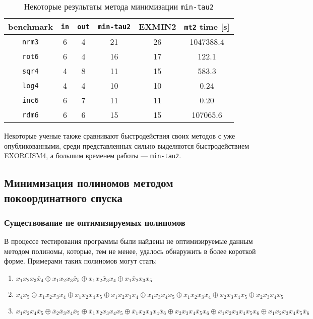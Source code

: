 \documentclass[a4paper,12pt,titlepage,finall]{article}
\begin{document}
\begin{table}[h!]
\centering
\begin{tabular}{ |c||c|c||c|c|c| }
\hline
\textbf{benchmark} & \texttt{\bf in} & \texttt{\bf out} & \texttt{min-tau2} & \textsc{EXMIN2} & \texttt{mt2} time [s] \\
\hline\hline
\texttt{nrm3} & 6 & 4 & 21 & 26 & 1047388.4 \\
\hline
\texttt{rot6} & 6 & 4 & 16 & 17 & 122.1     \\
\hline
\texttt{sqr4} & 4 & 8 & 11 & 15 & 583.3     \\
\hline\hline
\texttt{log4} & 4 & 4 & 10 & 10 & 0.24      \\
\hline
\texttt{inc6} & 6 & 7 & 11 & 11 & 0.20      \\
\hline
\texttt{rdm6} & 6 & 6 & 15 & 15 & 107065.6  \\
\hline
\end{tabular}
\caption{Некоторые результаты метода минимизации \texttt{min-tau2}}
\label{table_mintau}
\end{table}

Некоторые ученые также сравнивают быстродействия своих методов с уже опубликованными, среди представленных сильно выделяются быстродействием \textsc{EXORCISM4}, а большим временем работы --- \texttt{min-tau2}.

\subsection{Минимизация полиномов методом покоординатного спуска}

\subsubsection{Существование не оптимизируемых полиномов}

В процессе тестирования программы были найдены не оптимизируемые данным методом полиномы, которые, тем не менее, удалось обнаружить в более короткой форме. Примерами таких полиномов могут стать:
\begin{enumerate}
    \item $ x_1 x_2 x_3 \overline x_4 \oplus x_1 x_2 x_3 \overline x_5 \oplus x_1 x_2 \overline x_3 x_4 \oplus x_1 \overline x_2 x_3 x_5 $
    \item $ x_4 x_5 \oplus x_1 x_2 x_3 x_4 \oplus x_1 x_2 x_4 x_5 \oplus x_1 \overline x_2 \overline x_3 x_4 \oplus x_1 x_3 x_4 x_5 \oplus \overline x_1 \overline x_2 \overline x_3 \overline x_4 \oplus x_2 x_3 x_4 x_5 \oplus \overline x_2 \overline x_3 x_4 x_5 $
    \item $ x_1 x_2 x_4 \overline x_5 \oplus \overline x_2 \overline x_3 x_4 \overline x_5 \oplus \overline x_1 x_2 x_3 x_4 x_5 \oplus \overline x_1 x_2 x_3 x_4 \overline x_6 \oplus x_2 x_3 x_4 \overline x_5 x_6 \oplus x_1 x_2 x_3 x_4 x_5 x_6 \oplus x_1 x_2 x_3 x_4 \overline x_5 \overline x_6 $
\end{enumerate}
\end{document}
